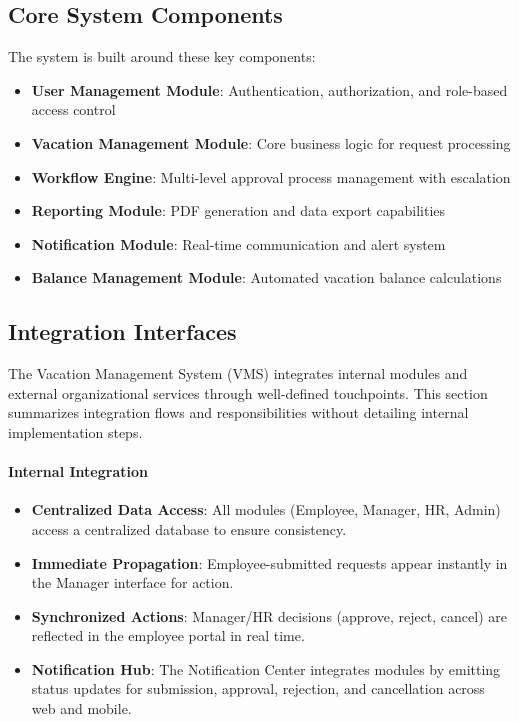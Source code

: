 \documentclass[12pt,a4paper]{article}
\begin{document}
\subsection{Core System Components}
The system is built around these key components:

\begin{itemize}
    \item \textbf{User Management Module}: Authentication, authorization, and role-based access control
    \item \textbf{Vacation Management Module}: Core business logic for request processing
    \item \textbf{Workflow Engine}: Multi-level approval process management with escalation
    \item \textbf{Reporting Module}: PDF generation and data export capabilities
    \item \textbf{Notification Module}: Real-time communication and alert system
    \item \textbf{Balance Management Module}: Automated vacation balance calculations
\end{itemize}

\subsection{Integration Interfaces}
The Vacation Management System (VMS) integrates internal modules and external organizational services through well-defined touchpoints. This section summarizes integration flows and responsibilities without detailing internal implementation steps.

\paragraph{Internal Integration}
\begin{itemize}
    \item \textbf{Centralized Data Access}: All modules (Employee, Manager, HR, Admin) access a centralized database to ensure consistency.
    \item \textbf{Immediate Propagation}: Employee-submitted requests appear instantly in the Manager interface for action.
    \item \textbf{Synchronized Actions}: Manager/HR decisions (approve, reject, cancel) are reflected in the employee portal in real time.
    \item \textbf{Notification Hub}: The Notification Center integrates modules by emitting status updates for submission, approval, rejection, and cancellation across web and mobile.
\end{itemize}
\end{document}
